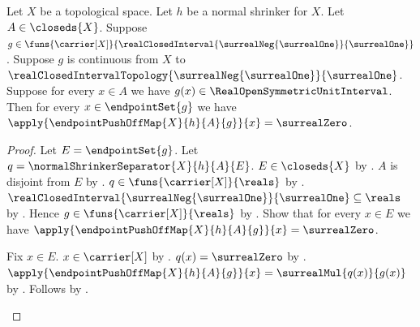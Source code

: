 \begin{theorem}\label{endpoint_push_off_map_eq_zero_on_endpoints}
    Let $X$ be a topological space.
    Let $h$ be a normal shrinker for $X$.
    Let $A\in\closeds{X}$.
    Suppose
        $g\in\funs{\carrier[X]}
            {\realClosedInterval
                {\surrealNeg{\surrealOne}}{\surrealOne}}$.
    Suppose $g$ is continuous from $X$ to
        $\realClosedIntervalTopology
            {\surrealNeg{\surrealOne}}{\surrealOne}$.
    Suppose for every $x\in A$ we have
        $g(x)\in\RealOpenSymmetricUnitInterval$.
    Then for every $x\in\endpointSet{g}$ we have
        $\apply{\endpointPushOffMap{X}{h}{A}{g}}{x}
            =\surrealZero$.
\end{theorem}
\begin{proof}
    Let $E=\endpointSet{g}$.
    Let $q=\normalShrinkerSeparator{X}{h}{A}{E}$.
    $E\in\closeds{X}$ by .
    $A$ is disjoint from $E$
        by .
    $q\in\funs{\carrier[X]}{\reals}$
        by .
    $\realClosedInterval
        {\surrealNeg{\surrealOne}}{\surrealOne}\subseteq\reals$
        by .
    Hence $g\in\funs{\carrier[X]}{\reals}$
        by .
    Show that for every $x\in E$ we have
        $\apply{\endpointPushOffMap{X}{h}{A}{g}}{x}
            =\surrealZero$.
    \begin{subproof}
        Fix $x\in E$.
        $x\in\carrier[X]$ by .
        $q(x)=\surrealZero$
            by .
        $\apply{\endpointPushOffMap{X}{h}{A}{g}}{x}
            =\surrealMul{q(x)}{g(x)}$
            by .
        Follows by
            .
    \end{subproof}
\end{proof}

